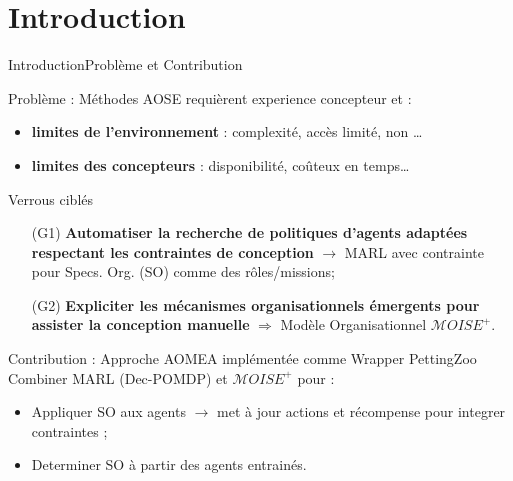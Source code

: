 

\addtocounter{framenumber}{-1}

\section{Introduction}

\begin{frame}{Introduction}{Problème et Contribution}


    \begin{alertblock}{Problème : Méthodes AOSE requièrent experience concepteur et  :}
        \begin{itemize}
            \item \textbf{limites de l'environnement} : complexité, accès limité, non \dots
            \item \textbf{limites des concepteurs} : disponibilité, coûteux en temps\dots
        \end{itemize}
    \end{alertblock}

    \begin{block}{Verrous ciblés}
        \begin{enumerate}
            \item[\phantom{X} (G1)] \textbf{Automatiser la recherche de politiques d'agents adaptées respectant les contraintes de conception} $\rightarrow$ MARL avec contrainte pour Specs. Org. (SO) comme des rôles/missions;
            \item[\phantom{X} (G2)] \textbf{Expliciter les mécanismes organisationnels émergents pour assister la conception manuelle} $\Longrightarrow$ Modèle Organisationnel $\mathcal{M}OISE^+$.
        \end{enumerate}
    \end{block}

    \begin{exampleblock}{Contribution : Approche AOMEA implémentée comme Wrapper PettingZoo~\parencite{soule2024}}
        Combiner MARL (Dec-POMDP) et $\mathcal{M}OISE^+$ pour :
        \begin{itemize}
            \item Appliquer SO aux agents $\rightarrow$ met à jour actions et récompense pour integrer contraintes ;
            \item Determiner SO  à partir des agents entrainés.
        \end{itemize}
    \end{exampleblock}

\end{frame}
